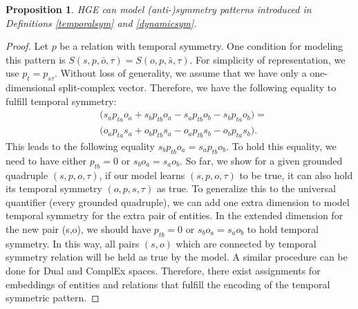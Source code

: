 \documentclass[letterpaper]{article} %
\newtheorem{proposition}{Proposition}
\begin{document}
 \begin{proposition}
HGE can model (anti-)symmetry patterns introduced in Definitions \ref{temporalsym} and \ref{dynamicsym}.
\label{th1:tempsym}
\end{proposition}
\begin{proof}
Let $p$ be a relation with temporal symmetry.
One condition for modeling this pattern is $S(s,p,\bar{o},\tau) =  S(o,p,\bar{s},\tau).$  For simplicity of representation, we use $p_t = p_{s\tau}.$
Without loss of generality, we assume that we have only a one-dimensional split-complex vector. Therefore, we have the following equality to fulfill temporal symmetry:
\begin{equation*}
\begin{split}
    &\big( s_a p_{ta} o_{a} + s_b p_{tb} o_{a} - s_a p_{tb} o_{b} - s_b p_{ta} o_{b}\big) = \\
    &\big( o_a p_{ta} s_{a} + o_b p_{tb} s_{a} - o_a p_{tb} s_{b} - o_b p_{ta} s_{b} \big).
\end{split}
\end{equation*}
This leads to the following equality $s_b p_{tb} o_{a} = s_a p_{tb} o_{b}.$
To hold this equality, we need to have either $p_{tb} = 0$ or $s_b o_{a} = s_a o_{b}$. 
So far, we show for a given grounded quadruple $(s,p,o,\tau)$, 
if our model learns $(s,p,o,\tau)$ to be true, it can also hold its temporal symmetry $(o,p,s,\tau)$ as true. 
To generalize this to the universal quantifier (every grounded quadruple),
we can add one extra dimension to model temporal symmetry for the extra pair of entities. In the extended dimension for the new pair (s,o), we should have $p_{tb} = 0$ or $s_b o_{a} = s_a o_{b}$ to hold temporal symmetry. In this way, all pairs $(s,o)$ which are connected by temporal symmetry relation will be held as true by the model.
A similar procedure can be done for Dual and ComplEx spaces. Therefore, there exist assignments for embeddings of entities and relations that fulfill the encoding of the temporal symmetric pattern. 
\end{proof}
\end{document}
